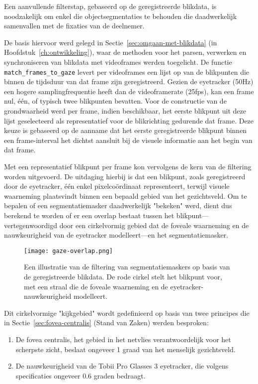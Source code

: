 Een aanvullende filterstap, gebaseerd op de geregistreerde blikdata, is noodzakelijk om enkel die objectsegmentaties 
te behouden die daadwerkelijk samenvallen met de fixaties van de deelnemer.

De basis hiervoor werd gelegd in Sectie~\ref{sec:omgaan-met-blikdata} (in Hoofdstuk~\ref{ch:ontwikkeling}), 
waar de methoden voor het parsen, verwerken en synchroniseren van blikdata met videoframes werden toegelicht. 
De functie \texttt{match\_frames\_to\_gaze} levert per videoframes een lijst op van de blikpunten die binnen de tijdsduur 
van dat frame zijn geregistreerd. 
Gezien de eyetracker (50Hz) een hogere samplingfrequentie heeft dan de videoframerate (25fps), 
kan een frame nul, één, of typisch twee blikpunten bevatten. 
Voor de constructie van de grondwaarheid werd per frame, indien beschikbaar, het eerste blikpunt uit deze lijst geselecteerd 
als representatief voor de blikrichting gedurende dat frame. 
Deze keuze is gebaseerd op de aanname dat het eerste geregistreerde blikpunt binnen een frame-interval 
het dichtst aansluit bij de visuele informatie aan het begin van dat frame.

Met een representatief blikpunt per frame kon vervolgens de kern van de filtering worden uitgevoerd. 
De uitdaging hierbij is dat een blikpunt, zoals geregistreerd door de eyetracker, één enkel pixelcoördinaat representeert, 
terwijl visuele waarneming plaatsvindt binnen een bepaald gebied van het gezichtsveld. 
Om te bepalen of een segmentatiemasker daadwerkelijk "bekeken" werd, dient dus berekend te worden of er een 
overlap bestaat tussen het blikpunt---vertegenwoordigd door een cirkelvormig gebied dat de foveale 
waarneming en de nauwkeurigheid van de eyetracker modelleert---en het segmentatiemasker.

\begin{figure}[H]
  \centering
  \texttt{[image: gaze-overlap.png]}
  \caption[]{\label{fig:gaze-overlap} 
    Een illustratie van de filtering van segmentatiemaskers op basis van de geregistreerde blikdata.
    De rode cirkel stelt het blikpunt voor, met een straal die de foveale waarneming en de eyetracker-nauwkeurigheid modelleert.
  }
\end{figure}

Dit cirkelvormige "kijkgebied" wordt gedefinieerd op basis van twee principes die in 
Sectie~\ref{sec:fovea-centralis} (Stand van Zaken) werden besproken:
\begin{enumerate}
    \item De fovea centralis, het gebied in het netvlies verantwoordelijk voor het scherpste zicht, beslaat ongeveer 1 graad van het menselijk gezichtsveld.
    \item De nauwkeurigheid van de Tobii Pro Glasses 3 eyetracker, die volgens specificaties ongeveer 0.6 graden bedraagt.
\end{enumerate}

